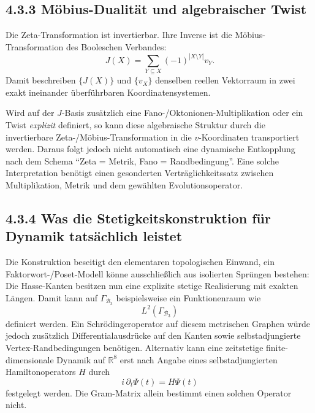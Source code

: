 \documentclass[11pt,a4paper]{article}
\begin{document}
\subsection*{4.3.3 Möbius-Dualität und algebraischer Twist}
Die Zeta-Transformation ist invertierbar. Ihre Inverse ist die Möbius-Transformation des Booleschen Verbandes:
\[
\boxed{
J(X)=\sum_{Y\subseteq X}(-1)^{|X\setminus Y|}v_Y.}
\]
Damit beschreiben $\{J(X)\}$ und $\{v_X\}$ denselben reellen Vektorraum in zwei exakt ineinander überführbaren Koordinatensystemen.

Wird auf der $J$-Basis zusätzlich eine Fano-/Oktonionen-Multiplikation oder ein Twist \emph{explizit} definiert, so kann diese algebraische Struktur durch die invertierbare Zeta-/Möbius-Transformation in die $v$-Koordinaten transportiert werden. Daraus folgt jedoch nicht automatisch eine dynamische Entkopplung nach dem Schema ``Zeta = Metrik, Fano = Randbedingung''. Eine solche Interpretation benötigt einen gesonderten Verträglichkeitssatz zwischen Multiplikation, Metrik und dem gewählten Evolutionsoperator.

\subsection*{4.3.4 Was die Stetigkeitskonstruktion für Dynamik tatsächlich leistet}
Die Konstruktion beseitigt den elementaren topologischen Einwand, ein Faktorwort-/Poset-Modell könne ausschließlich aus isolierten Sprüngen bestehen: Die Hasse-Kanten besitzen nun eine explizite stetige Realisierung mit exakten Längen. Damit kann auf $\Gamma_{\mathcal B_3}$ beispielsweise ein Funktionenraum wie
\[
L^2(\Gamma_{\mathcal B_3})
\]
definiert werden. Ein Schrödingeroperator auf diesem metrischen Graphen würde jedoch zusätzlich Differentialausdrücke auf den Kanten sowie selbstadjungierte Vertex-Randbedingungen benötigen. Alternativ kann eine zeitstetige finite-dimensionale Dynamik auf $\mathbb R^8$ erst nach Angabe eines selbstadjungierten Hamiltonoperators $H$ durch
\[
i\,\partial_t\Psi(t)=H\Psi(t)
\]
festgelegt werden. Die Gram-Matrix allein bestimmt einen solchen Operator nicht.
\end{document}
